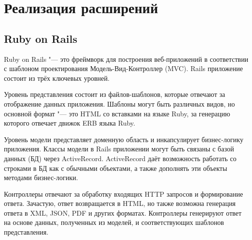 \lstset{language=Ruby}

\chapter{Реализация расширений}

\section{Ruby on Rails}
Ruby on Rails "--- это фреймворк для построения веб-приложений в соответствии с
шаблоном проектирования Модель-Вид-Контроллер (MVC). Rails приложение состоит
из трёх ключевых уровней.

Уровень представления состоит из файлов-шаблонов, которые отвечают за
отображение данных приложения. Шаблоны могут быть различных видов, но основной
формат "--- это HTML со вставками на языке Ruby, за генерацию которого отвечает
движок ERB языка Ruby.

Уровень модели представляет доменную область и инкапсулирует бизнес-логику
приложения. Классы модели в Rails приложении могут быть связаны с базой данных
(БД) через ActiveRecord. ActiveRecord даёт возможность работать со строками в
БД как с обычными объектами, а также дополнять эти объекты методами
бизнес-логики.

Контроллеры отвечают за обработку входящих HTTP запросов и формирование ответа.
Зачастую, ответ возвращается в HTML, но также возможна генерация ответа в XML,
JSON, PDF и других форматах. Контроллеры генерируют ответ на основе данных,
полученных из моделей, и соответствующих шаблонов представления.

